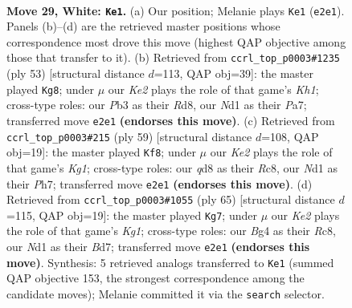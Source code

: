 \documentclass[11pt]{article}
\begin{document}
\clearpage

\begin{figure}[p]\centering
\begin{subfigure}{0.46\textwidth}\centering
\resizebox{\linewidth}{!}{%
\newchessgame
\chessboard[
  setfen={1n1qkb1r/1Q2n3/r1p3p1/p2p2P1/3P1PBp/RP5P/1BP1K3/3N3R w - - 1 29},
  showmover=false,
  pgfstyle=straightmove, color=movearrow, markmove={e2-e1}
]}
\caption{}
\end{subfigure}\hfill
\begin{subfigure}{0.46\textwidth}\centering
\resizebox{\linewidth}{!}{%
\newchessgame
\chessboard[
  setfen={3r3k/p2n1pp1/2b2b1p/q2p1B1P/2pP4/2N1PN2/P1Q2PP1/1R4K1 b - - 11 27},
  showmover=false,
  pgfstyle=straightmove, color=movearrow, markmove={h8-g8}
]}
\caption{}
\end{subfigure}
\\[4pt]
\begin{subfigure}{0.46\textwidth}\centering
\resizebox{\linewidth}{!}{%
\newchessgame
\chessboard[
  setfen={2r3k1/1b3p1p/pp3np1/2bPq3/P1Q5/2N2PP1/1P4NP/3R1B1K b - - 5 30},
  showmover=false,
  pgfstyle=straightmove, color=movearrow, markmove={g8-f8}
]}
\caption{}
\end{subfigure}\hfill
\begin{subfigure}{0.46\textwidth}\centering
\resizebox{\linewidth}{!}{%
\newchessgame
\chessboard[
  setfen={2r3k1/3brp2/1q1pnbp1/1p5p/1P2Pp2/R1PQ1N1P/B2N1PP1/2R3K1 b - - 11 33},
  showmover=false,
  pgfstyle=straightmove, color=movearrow, markmove={g8-g7}
]}
\caption{}
\end{subfigure}
\caption{\textbf{Move 29, White: \texttt{Ke1}.} (a) Our position; Melanie plays \texttt{Ke1} (\texttt{e2e1}). Panels (b)--(d) are the retrieved master positions whose correspondence most drove this move (highest QAP objective among those that transfer to it). (b) Retrieved from \texttt{ccrl\_top\_p0003\#1235} (ply 53) [structural distance $d$=113, QAP obj=39]: the master played \texttt{Kg8}; under $\mu$ our \emph{Ke2} plays the role of that game's \emph{Kh1}; cross-type roles: our \emph{P}b3 as their \emph{R}d8, our \emph{N}d1 as their \emph{P}a7; transferred move \texttt{e2e1} \textbf{(endorses this move)}. (c) Retrieved from \texttt{ccrl\_top\_p0003\#215} (ply 59) [structural distance $d$=108, QAP obj=19]: the master played \texttt{Kf8}; under $\mu$ our \emph{Ke2} plays the role of that game's \emph{Kg1}; cross-type roles: our \emph{q}d8 as their \emph{R}c8, our \emph{N}d1 as their \emph{P}h7; transferred move \texttt{e2e1} \textbf{(endorses this move)}. (d) Retrieved from \texttt{ccrl\_top\_p0003\#1055} (ply 65) [structural distance $d$=115, QAP obj=19]: the master played \texttt{Kg7}; under $\mu$ our \emph{Ke2} plays the role of that game's \emph{Kg1}; cross-type roles: our \emph{B}g4 as their \emph{R}c8, our \emph{N}d1 as their \emph{B}d7; transferred move \texttt{e2e1} \textbf{(endorses this move)}. Synthesis: 5 retrieved analogs transferred to \texttt{Ke1} (summed QAP objective 153, the strongest correspondence among the candidate moves); Melanie committed it via the \texttt{search} selector.}
\label{fig:thought-m56}
\end{figure}
\end{document}
